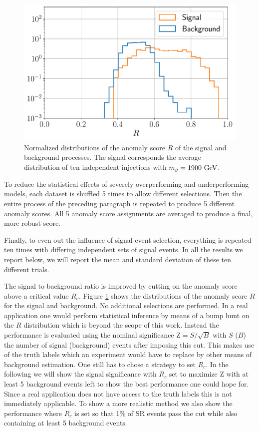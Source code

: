 \documentclass[prd, twocolumn, superscriptaddress,floatfix, nofootinbib, preprintnumbers]{revtex4-2}
\begin{document}
\begin{figure}[b]
\centering
\includegraphics[width=0.9\linewidth]{R.pdf}
\caption{Normalized distributions of the anomaly score $R$ of the signal and background processes. The signal corresponds the average distribution of ten independent injections with $m_{\tilde{g}}=1900~{\rm GeV}$.}
\label{fig:R}
\end{figure}



To reduce the statistical effects of severely overperforming and underperforming models, each dataset is shuffled 5 times to allow different selections. Then the entire process of the preceding paragraph is repeated to produce 5 different anomaly scores. All 5 anomaly score assignments are averaged to produce a final, more robust score. 

Finally, to even out the influence of signal-event selection, everything is repeated ten times with differing independent sets of signal events. In all the results we report below, we will report the mean and standard deviation of these ten different trials.

The signal to background ratio is improved by cutting on the anomaly score above a critical value $R_c$. Figure \ref{fig:R} shows the distributions of the anomaly score $R$ for the signal and background. No additional selections are performed. In a real application one would perform statistical inference by means of a bump hunt on the $R$ distribution which is beyond the scope of this work. Instead the performance is evaluated using the nominal significance $\text{Z}=S/\sqrt{B}$ with $S$ ($B$) the number of signal (background) events after imposing this cut. This makes use of the truth labels which an experiment would have to replace by other means of background estimation.
One still has to chose a strategy to set $R_c$. In the following we will show the signal significance with $R_c$ set to maximize Z with at least 5 background events left to show the best performance one could hope for. Since a real application does not have access to the truth labels this is not immediately applicable. To show a more realistic method we also show the performance where $R_c$ is set so that 1\% of SR events pass the cut while also containing at least 5 background events.
\end{document}
